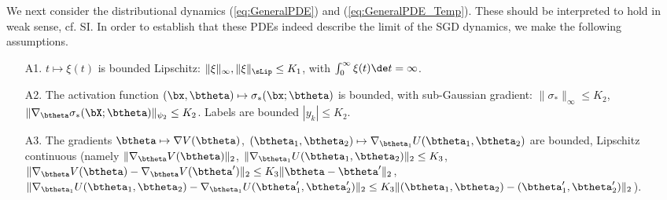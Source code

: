 \documentclass[11pt]{article}
\renewcommand{\eqref}[1]{(\ref{#1})}
\begin{document}
We next consider the distributional dynamics \eqref{eq:GeneralPDE} and \eqref{eq:GeneralPDE_Temp}. These should be interpreted to hold in weak
sense, cf. SI.
%
%
%
In order to establish that these PDEs indeed describe the limit of the SGD dynamics, we make the following assumptions.
%
\begin{itemize}
%
\item[{\sf A1.}] $t\mapsto \xi(t)$ is bounded Lipschitz: $\|\xi\|_{\infty}, \|\xi\|_{\sLip}\le K_1$, with $\int_0^{\infty}\xi(t) \de t=\infty$.
%
\item[{\sf A2.}] The activation function $(\bx,\btheta)\mapsto \sigma_*(\bx;\btheta)$ is bounded, with sub-Gaussian gradient: $\|\sigma_*\|_{\infty}\le K_2$, $\|\nabla_{\btheta}
\sigma_*(\bX;\btheta)\|_{\psi_2}\le K_2$. Labels are bounded $|y_k|\le K_2$.
%
\item[{\sf A3.}] The gradients $\btheta\mapsto \nabla V(\btheta)$, $(\btheta_1,\btheta_2)\mapsto \nabla_{\btheta_1}U(\btheta_1,\btheta_2)$  are bounded, Lipschitz continuous 
(namely $\| \nabla_{\btheta}V(\btheta) \|_2$, $\|\nabla_{\btheta_1}U(\btheta_1,\btheta_2)\|_2\le K_3$, $\|\nabla_{\btheta}V(\btheta)-\nabla_{\btheta}V(\btheta')\|_2\le K_3 \|\btheta-\btheta'\|_2$, $\|\nabla_{\btheta_1}U(\btheta_1,\btheta_2)-\nabla_{\btheta_1}U(\btheta'_1,\btheta_2')\|_2\le K_3 \|(\btheta_1,\btheta_2)-
(\btheta_1',\btheta_2')\|_2$).
%
\end{itemize}
%
\end{document}
